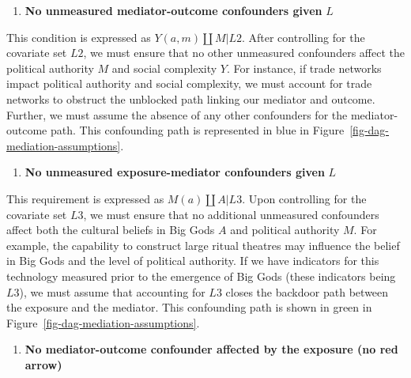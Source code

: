 \documentclass[
  singlecolumn]{article}
\providecommand{\tightlist}{%
  \setlength{\itemsep}{0pt}\setlength{\parskip}{0pt}}\usepackage{longtable,booktabs,array}
\begin{document}
\begin{enumerate}
\def\labelenumi{\arabic{enumi}.}
\setcounter{enumi}{1}
\tightlist
\item
  \textbf{No unmeasured mediator-outcome confounders given} \(L\)
\end{enumerate}

This condition is expressed as \(Y(a,m) \coprod M | L2\). After
controlling for the covariate set \(L2\), we must ensure that no other
unmeasured confounders affect the political authority \(M\) and social
complexity \(Y\). For instance, if trade networks impact political
authority and social complexity, we must account for trade networks to
obstruct the unblocked path linking our mediator and outcome. Further,
we must assume the absence of any other confounders for the
mediator-outcome path. This confounding path is represented in blue in
Figure~\ref{fig-dag-mediation-assumptions}.

\begin{enumerate}
\def\labelenumi{\arabic{enumi}.}
\setcounter{enumi}{2}
\tightlist
\item
  \textbf{No unmeasured exposure-mediator confounders given} \(L\)
\end{enumerate}

This requirement is expressed as \(M(a) \coprod A | L3\). Upon
controlling for the covariate set \(L3\), we must ensure that no
additional unmeasured confounders affect both the cultural beliefs in
Big Gods \(A\) and political authority \(M\). For example, the
capability to construct large ritual theatres may influence the belief
in Big Gods and the level of political authority. If we have indicators
for this technology measured prior to the emergence of Big Gods (these
indicators being \(L3\)), we must assume that accounting for \(L3\)
closes the backdoor path between the exposure and the mediator. This
confounding path is shown in green in
Figure~\ref{fig-dag-mediation-assumptions}.

\begin{enumerate}
\def\labelenumi{\arabic{enumi}.}
\setcounter{enumi}{3}
\tightlist
\item
  \textbf{No mediator-outcome confounder affected by the exposure (no
  red arrow)}
\end{enumerate}
\end{document}
